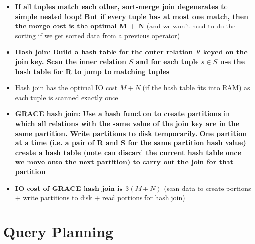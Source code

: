 \documentclass[20pt,a4paper,landscape]{extarticle}
\begin{document}
\begin{flushleft}
\begin{itemize}
\begin{lstlisting}[basicstyle=\ttfamily\bfseries,
    columns=fixed,
    numbers=left,
    breaklines=true,
    breakatwhitespace=true,
    breakindent=0pt]
s =: head(S_sorted)
while r $\neq$ EOF and s $\neq$ EOF:
    if r.A > s.A then s = s.next
    else if r.A < s.A then r = r.next
    // r.A = S.A
    else then { emit (r, s); s = s.next } // this does not handle the edge case of duplicates in R.A
\end{lstlisting}
\item \textbf{If all tuples match each other, sort-merge join degenerates to simple nested loop! But if every tuple has at most one match, then the merge cost is the optimal M + N} (and we won't need to do the sorting if we get sorted data from a previous operator)
\item \textbf{Hash join: Build a hash table for the \underline{outer} relation \boldmath$R$ keyed on the join key. Scan the \underline{inner} relation $S$ and for each tuple $s \in S$ use the hash table for R to jump to matching tuples}
\item Hash join has the optimal IO cost $M + N$ (if the hash table fits into RAM) as each tuple is scanned exactly once
\item \textbf{GRACE hash join: Use a hash function to create partitions in which all relations with the same value of the join key are in the same partition. Write partitions to disk temporarily. One partition at a time (i.e. a pair of R and S for the same partition hash value) create a hash table (note can discard the current hash table once we move onto the next partition) to carry out the join for that partition}
\item \textbf{IO cost of GRACE hash join is \boldmath$3(M+N)$} (scan data to create portions + write partitions to disk + read portions for hash join)
\end{itemize}
\section{Query Planning}

\end{flushleft}
\end{document}
